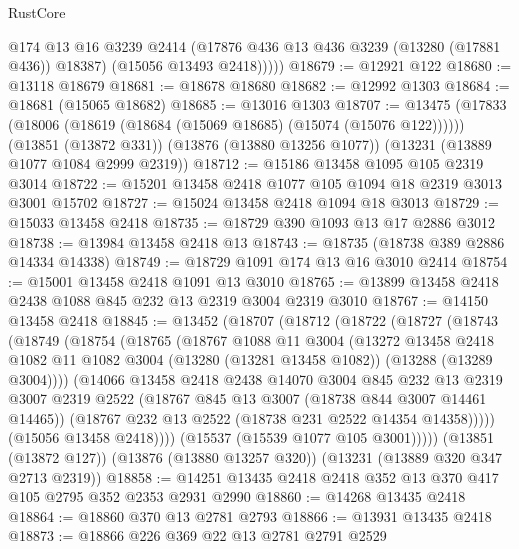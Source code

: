 \begin{lexlean}{RustCore}
\begin{coremodule}
            @174
            @13
            @16
            @3239
            @2414
            (@17876 @436 @13 @436 @3239 (@13280 (@17881 @436)) @18387)
            (@15056 @13493 @2418)))))
@18679 := @12921 @122
@18680 := @13118 @18679
@18681 := @18678 @18680
@18682 := @12992 @1303
@18684 := @18681 (@15065 @18682)
@18685 := @13016 @1303
@18707 := @13475
    (@17833 (@18006 (@18619 (@18684 (@15069 @18685) (@15074 (@15076 @122))))))
    (@13851 (@13872 @331))
    (@13876 (@13880 @13256 @1077))
    (@13231 (@13889 @1077 @1084 @2999 @2319))
@18712 := @15186 @13458 @1095 @105 @2319 @3014
@18722 := @15201 @13458 @2418 @1077 @105 @1094 @18 @2319 @3013 @3001 @15702
@18727 := @15024 @13458 @2418 @1094 @18 @3013
@18729 := @15033 @13458 @2418
@18735 := @18729 @390 @1093 @13 @17 @2886 @3012
@18738 := @13984 @13458 @2418 @13
@18743 := @18735 (@18738 @389 @2886 @14334 @14338)
@18749 := @18729 @1091 @174 @13 @16 @3010 @2414
@18754 := @15001 @13458 @2418 @1091 @13 @3010
@18765 := @13899 @13458 @2418 @2438 @1088 @845 @232 @13 @2319 @3004 @2319 @3010
@18767 := @14150 @13458 @2418
@18845 := @13452
    (@18707
      (@18712
        (@18722
          (@18727
            (@18743
              (@18749
                (@18754
                  (@18765
                    (@18767
                      @1088
                      @11
                      @3004
                      (@13272
                        @13458
                        @2418
                        @1082
                        @11
                        @1082
                        @3004
                        (@13280 (@13281 @13458 @1082))
                        (@13288 (@13289 @3004))))
                    (@14066
                      @13458
                      @2418
                      @2438
                      @14070
                      @3004
                      @845
                      @232
                      @13
                      @2319
                      @3007
                      @2319
                      @2522
                      (@18767 @845 @13 @3007 (@18738 @844 @3007 @14461 @14465))
                      (@18767 @232 @13 @2522 (@18738 @231 @2522 @14354 @14358)))))
                (@15056 @13458 @2418))))
          (@15537 (@15539 @1077 @105 @3001)))))
    (@13851 (@13872 @127))
    (@13876 (@13880 @13257 @320))
    (@13231 (@13889 @320 @347 @2713 @2319))
@18858 := @14251 @13435 @2418 @2418 @352 @13 @370 @417 @105 @2795 @352 @2353 @2931 @2990
@18860 := @14268 @13435 @2418
@18864 := @18860 @370 @13 @2781 @2793
@18866 := @13931 @13435 @2418
@18873 := @18866 @226 @369 @22 @13 @2781 @2791 @2529

\end{coremodule}
\end{lexlean}
